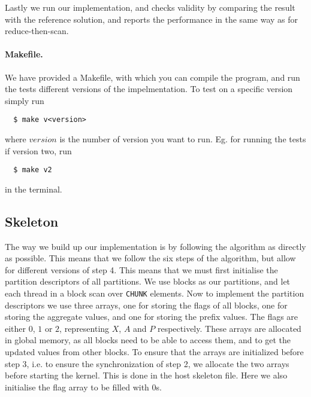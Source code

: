 Lastly we run our implementation, and checks validity by comparing the result with the reference solution, and reports the performance in the same way as for reduce-then-scan.

\paragraph{Makefile.}
We have provided a Makefile, with which you can compile the program, and run the tests different versions of the impelmentation.
To test on a specific version simply run
\begin{lstlisting}
  $ make v<version>
\end{lstlisting}
where $version$ is the number of version you want to run. Eg. for running the tests if version two, run
\begin{lstlisting}
  $ make v2
\end{lstlisting}
in the terminal.


\subsection{Skeleton}
The way we build up our implementation is by following the algorithm as directly as possible.
This means that we follow the six steps of the algorithm, but allow for different versions of step 4.
This means that we must first initialise the partition descriptors of all partitions.
We use blocks as our partitions, and let each thread in a block scan over \texttt{CHUNK} elements.
Now to implement the partition descriptors we use three arrays, one for storing the flags of all blocks, one for storing the aggregate values, and one for storing the prefix values.
The flags are either $0$, $1$ or $2$, representing $X$, $A$ and $P$ respectively.
These arrays are allocated in global memory, as all blocks need to be able to access them, and to get the updated values from other blocks.
To ensure that the arrays are initialized before step 3, i.e. to ensure the synchronization of step 2, we allocate the two arrays before starting the kernel.
This is done in the host skeleton file. Here we also initialise the flag array to be filled with $0$s.

